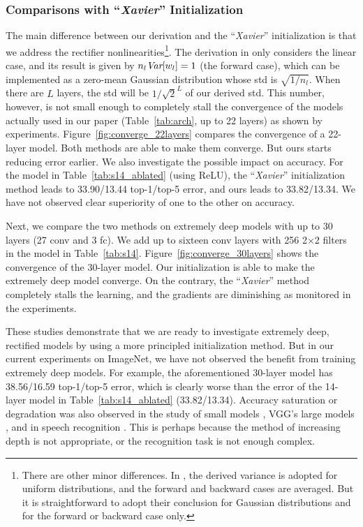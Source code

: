 \documentclass[10pt,twocolumn,letterpaper]{article}
\newcommand{\var}{\emph{Var}}
\begin{document}
\subsubsection*{Comparisons with ``\emph{Xavier}'' Initialization \cite{Glorot2010}}

The main difference between our derivation and the ``\emph{Xavier}'' initialization \cite{Glorot2010} is that we address the rectifier nonlinearities\footnote{There are other minor differences. In \cite{Glorot2010}, the derived variance is adopted for uniform distributions, and the forward and backward cases are averaged. But it is straightforward to adopt their conclusion for Gaussian distributions and for the forward or backward case only.}. The derivation in \cite{Glorot2010} only considers the linear case, and its result is given by $n_l\var[w_{l}]=1$ (the forward case), which can be implemented as a zero-mean Gaussian distribution whose std is $\sqrt{1/{n_l}}$. When there are $L$ layers, the std will be ${1}/{\sqrt{2}^L}$ of our derived std. This number, however, is not small enough to completely stall the convergence of the models actually used in our paper (Table~\ref{tab:arch}, up to 22 layers) as shown by experiments.
Figure~\ref{fig:converge_22layers} compares the convergence of a 22-layer model.
Both methods are able to make them converge. But ours starts reducing error earlier. We also investigate the possible impact on accuracy. For the model in Table~\ref{tab:s14_ablated} (using ReLU), the ``\emph{Xavier}'' initialization method leads to 33.90/13.44 top-1/top-5 error, and ours leads to 33.82/13.34. We have not observed clear superiority of one to the other on accuracy.

Next, we compare the two methods on extremely deep models with up to 30 layers (27 conv and 3 fc). We add up to sixteen conv layers with 256 2$\times$2 filters in the model in Table~\ref{tab:s14}. Figure~\ref{fig:converge_30layers} shows the convergence of the 30-layer model. Our initialization is able to make the extremely deep model converge. On the contrary, the ``\emph{Xavier}'' method completely stalls the learning, and the gradients are diminishing as monitored in the experiments.

These studies demonstrate that we are ready to investigate extremely deep, rectified models by using a more principled initialization method. But in our current experiments on ImageNet, we have not observed the benefit from training extremely deep models. For example, the aforementioned 30-layer model has 38.56/16.59 top-1/top-5 error, which is clearly worse than the error of the 14-layer model in Table~\ref{tab:s14_ablated} (33.82/13.34).
Accuracy saturation or degradation was also observed in the study of small models \cite{He2014a},
VGG's large models \cite{Simonyan2014}, and in speech recognition \cite{Zeiler2013}. This is perhaps because the method of increasing depth is not appropriate, or the recognition task is not enough complex.
\end{document}
